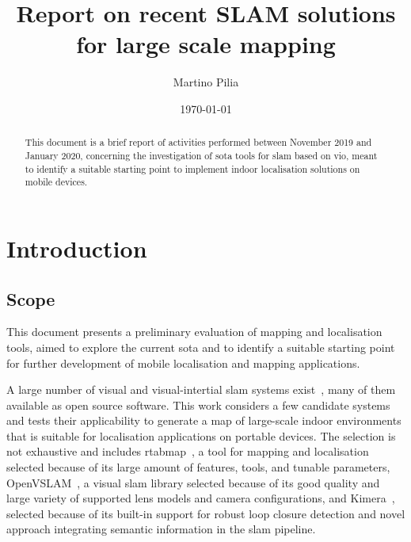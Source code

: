 \documentclass[11pt, letterpaper, twoside]{article}
\title{Report on recent SLAM solutions for large scale mapping}
\author{Martino Pilia}
\date{\today}
\begin{document}
\maketitle

\begin{abstract}
    This document is a brief report of activities performed between November 2019
    and January 2020, concerning the investigation of \gls{sota} tools
    for \gls{slam} based on \gls{vio}, meant to identify a suitable starting point
    to implement indoor localisation solutions on mobile devices.
\end{abstract}

\newpage

\tableofcontents

\newpage

\glsfindwidesttoplevelname[\acronymtype]
\printglossary[type=\acronymtype,style=alttree,title=Abbreviations,nonumberlist]

\newpage

\section{Introduction}

\subsection{Scope}

This document presents a preliminary evaluation of mapping and localisation
tools, aimed to explore the current \gls{sota} and to identify a suitable
starting point for further development of mobile localisation and mapping
applications.

A large number of visual and visual-intertial \gls{slam} systems
exist~\cite{huang2019survey}, many of them available as open source software.
This work considers a few candidate systems and tests their applicability to
generate a map of large-scale indoor environments that is suitable for
localisation applications on portable devices. The selection is not exhaustive
and includes \gls{rtabmap}~\cite{labbe2019rtab}, a tool for mapping and
localisation selected because of its large amount of features, tools, and
tunable parameters, OpenVSLAM~\cite{openvslam2019}, a visual \gls{slam} library
selected because of its good quality and large variety of supported lens models
and camera configurations, and Kimera~\cite{rosinol2019kimera}, selected
because of its built-in support for robust loop closure detection and novel
approach integrating semantic information in the \gls{slam} pipeline.
\end{document}
